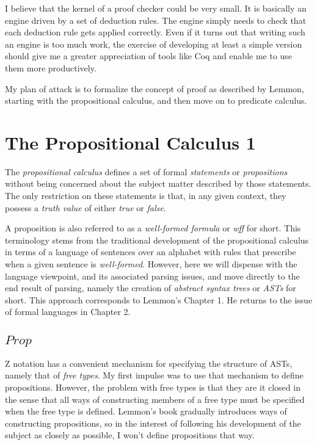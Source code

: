 \documentclass[11pt, oneside]{article}
\begin{document}
I believe that the kernel of a proof checker could be very small.
It is basically an engine driven by a set of deduction rules.
The engine simply needs to check that each deduction rule gets applied correctly.
Even if it turns out that writing such an engine is too much work, the exercise of developing
at least a simple version should give me a greater appreciation of tools like Coq and enable me to
use them more productively.

My plan of attack is to formalize the concept of proof as described by Lemmon, starting with
the propositional calculus, and then move on to predicate calculus.

\section{The Propositional Calculus 1}

The {\it propositional calculus} defines a set of formal {\it statements} or {\it propositions}
without being concerned about the subject matter described by those statements.
The only restriction on these statements is that, in any given context, 
they possess a {\it truth value} of either {\it true} or {\it false}.

A proposition is also referred to as a {\it well-formed formula} or {\it wff} for short.
This terminology stems from the traditional development of the propositional calculus in terms of
a language of sentences over an alphabet with rules that prescribe when a given sentence is {\it well-formed}.
However, here we will dispense with the language viewpoint, and its associated parsing issues, and move directly
to the end result of parsing, namely the creation of {\it abstract syntax trees} or {\it ASTs} for short.
This approach corresponds to Lemmon's Chapter 1.
He returns to the issue of formal languages in Chapter 2.

\subsection{$Prop$}


Z notation has a convenient mechanism for specifying the structure of ASTs, namely that of {\it free types}.
My first impulse was to use that mechanism to define propositions.
However, the problem with free types is that they are {it closed} in the sense that all ways of constructing members of a free type
must be specified when the free type is defined.
Lemmon's book gradually introduces ways of constructing propositions, so in the interest of following his development of the subject
as closely as possible, I won't define propositions that way.
\end{document}
